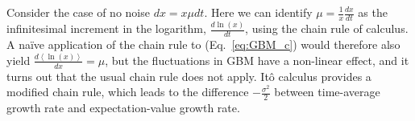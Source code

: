 \documentclass[a4paper]{article}
\newcommand{\Ito}{It\^{o} }
\newcommand{\ave}[1]{\left\langle#1 \right\rangle}
\newcommand{\eref}[1]{(Eq.~\ref{eq:#1})}
\begin{document}
Consider the case of no noise $dx=x \mu dt$. Here we can identify $\mu=\frac{1}{x}\frac{dx}{dt}$ 
as the infinitesimal increment in the logarithm, $\frac{d \ln(x)}{dt}$, using the chain rule of calculus. 
A na\"ive application of the chain rule to \eref{GBM_c} would therefore also yield $\frac{d \ave{\ln(x)}}{dx}=\mu$, 
but the fluctuations in GBM have a non-linear effect, and it turns out that the usual chain rule does not apply. \Ito
calculus provides a modified chain rule, which leads to the difference $-\frac{\sigma^2}{2}$ between time-average
growth rate and expectation-value growth rate.




\end{document}
